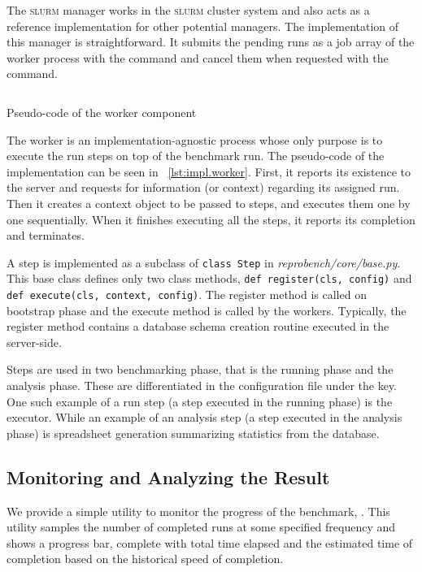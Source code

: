 The \textsc{slurm} manager works in the \textsc{slurm} cluster system \citep{yoo2003slurm} and also acts as a reference implementation for other potential managers.
The implementation of this manager is straightforward.
It submits the pending runs as a job array of the worker process with the  command and cancel them when requested with the  command.

\begin{listing}
    \inputminted{python}{assets/listings/pseudocodes/worker.py}
    \caption{Pseudo-code of the worker component}
    \label{lst:impl.worker}
\end{listing}

The worker is an implementation-agnostic process whose only purpose is to execute the run steps on top of the benchmark run.
The pseudo-code of the implementation can be seen in \lst~\ref{lst:impl.worker}.
First, it reports its existence to the server and requests for information (or context) regarding its assigned run.
Then it creates a context object to be passed to steps, and executes them one by one sequentially.
When it finishes executing all the steps, it reports its completion and terminates.

A step is implemented as a subclass of \texttt{class Step} in \emph{reprobench/core/base.py}.
This base class defines only two class methods, \texttt{def register(cls, config)} and \texttt{def execute(cls, context, config)}.
The register method is called on bootstrap phase and the execute method is called by the workers.
Typically, the register method contains a database schema creation routine executed in the server-side.

Steps are used in two benchmarking phase, that is the running phase and the analysis phase.
These are differentiated in the configuration file under the  key.
One such example of a run step (a step executed in the running phase) is the executor.
While an example of an analysis step (a step executed in the analysis phase) is spreadsheet generation summarizing statistics from the database.

\subsection{Monitoring and Analyzing the Result}

We provide a simple utility to monitor the progress of the benchmark, .
This utility samples the number of completed runs at some specified frequency and shows a progress bar, complete with total time elapsed and the estimated time of completion based on the historical speed of completion.

